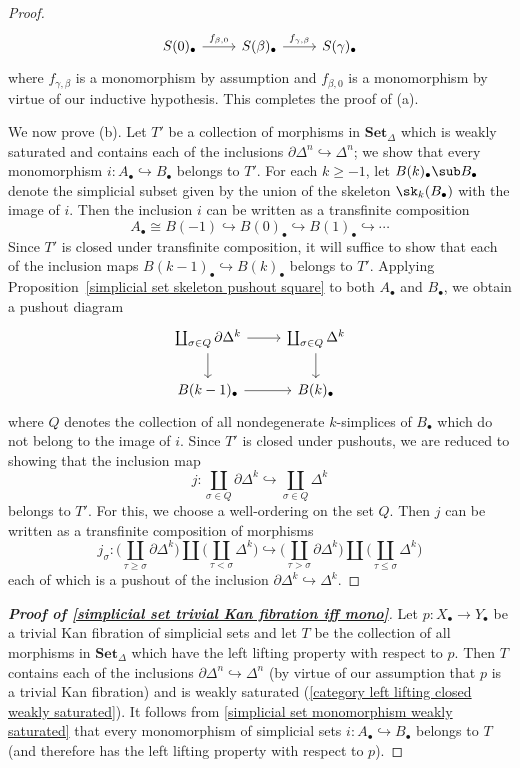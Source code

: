 \begin{proof}
\[\begin{tikzcd}
S(0)_\bullet\ar[r,"f_{\beta,0}"]&S(\beta)_\bullet\ar[r,"f_{\gamma,\beta}"]&S(\gamma)_\bullet
\end{tikzcd}\]
where $f_{\gamma,\beta}$ is a monomorphism by assumption and $f_{\beta,0}$ is a monomorphism by virtue of our inductive hypothesis. This completes the proof of (a).\par
We now prove (b). Let $T'$ be a collection of morphisms in $\mathbf{Set}_\Delta$ which is weakly saturated and contains each of the inclusions $\partial\Delta^n\hookrightarrow\Delta^n$; we show that every monomorphism $i:A_\bullet\hookrightarrow B_\bullet$ belongs to $T'$. For each $k\geq -1$, let $B(k)_\bullet\sub B_\bullet$ denote the simplicial subset given by the union of the skeleton $\sk_k(B_\bullet)$ with the image of $i$. Then the inclusion $i$ can be written as a transfinite composition
\[A_\bullet\cong B(-1)\hookrightarrow B(0)_\bullet\hookrightarrow B(1)_\bullet\hookrightarrow\cdots\]
Since $T'$ is closed under transfinite composition, it will suffice to show that each of the inclusion maps $B(k-1)_\bullet\hookrightarrow B(k)_\bullet$ belongs to $T'$. Applying Proposition~\ref{simplicial set skeleton pushout square} to both $A_\bullet$ and $B_\bullet$, we obtain a pushout diagram
\[\begin{tikzcd}
\coprod_{\sigma\in Q}\partial\Delta^k\ar[r]\ar[d]&\coprod_{\sigma\in Q}\Delta^k\ar[d]\\
B(k-1)_\bullet\ar[r]&B(k)_\bullet
\end{tikzcd}\]
where $Q$ denotes the collection of all nondegenerate $k$-simplices of $B_\bullet$ which do not belong to the image of $i$. Since $T'$ is closed under pushouts, we are reduced to showing that the inclusion map
\[j:\coprod_{\sigma\in Q}\partial\Delta^k\hookrightarrow\coprod_{\sigma\in Q}\Delta^k\]
belongs to $T'$. For this, we choose a well-ordering on the set $Q$. Then $j$ can be written as a transfinite composition of morphisms
\[j_\sigma:\Big(\coprod_{\tau\geq\sigma}\partial\Delta^k\Big)\coprod\Big(\coprod_{\tau<\sigma}\Delta^k\Big)\hookrightarrow\Big(\coprod_{\tau>\sigma}\partial\Delta^k\Big)\coprod\Big(\coprod_{\tau\leq\sigma}\Delta^k\Big)\]
each of which is a pushout of the inclusion $\partial\Delta^k\hookrightarrow\Delta^k$.
\end{proof}
\begin{proof}[\textbf{Proof of \cref{simplicial set trivial Kan fibration iff mono}}]
Let $p:X_\bullet\to Y_\bullet$ be a trivial Kan fibration of simplicial sets and let $T$ be the collection of all morphisms in $\mathbf{Set}_\Delta$ which have the left lifting property with respect to $p$. Then $T$ contains each of the inclusions $\partial\Delta^n\hookrightarrow\Delta^n$ (by virtue of our assumption that $p$ is a trivial Kan fibration) and is weakly saturated (\cref{category left lifting closed weakly saturated}). It follows from \cref{simplicial set monomorphism weakly saturated} that every monomorphism of simplicial sets $i:A_\bullet\hookrightarrow B_\bullet$ belongs to $T$ (and therefore has the left lifting property with respect to $p$).
\end{proof}
